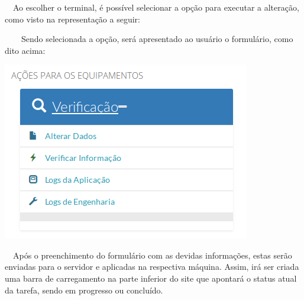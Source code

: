 {\color{black}
    \ \ Ao escolher o terminal, \'e poss\'ivel selecionar a op\c{c}\~ao para executar a altera\c{c}\~ao, como visto na
        representa\c{c}\~ao a seguir:}

{\color{black}
    \ \ \ \ Sendo selecionada a op\c{c}\~ao, ser\'a apresentado ao usu\'ario o formul\'ario, como dito acima:}

    \begin{center}
    \includegraphics[width=10.82cm,height=7.777cm]{figuras/RATCETECATMSTFLS051718v2-img005.png}
    \end{center}

    \bigskip

{\color{black}
    \ \ Ap\'os o preenchimento do formul\'ario com as devidas informa\c{c}\~oes, estas ser\~ao enviadas para o servidor e
        aplicadas na respectiva m\'aquina. Assim, ir\'a ser criada uma barra de carregamento na parte inferior do site que
        apontar\'a o status atual da tarefa, sendo em progresso ou conclu\'ido. }

